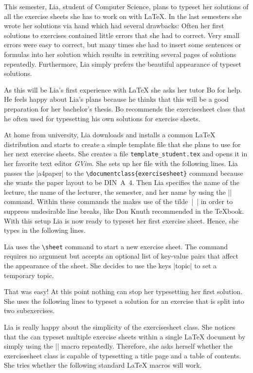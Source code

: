 \documentclass[a4paper,fleqn]{report}
\def\exercisesheet{{exercisesheet}}
\begin{document}
This semester, Lia, student of Computer Science, plans to typeset her
solutions of all the exercise sheets she has to work on with \LaTeX.
In the last semesters she wrote her solutions via hand which had
several drawbacks: Often her first solutions to exercises contained
little errors that she had to correct. Very small errors were easy to
correct, but many times she had to insert some sentences or formulas
into her solution which results in rewriting several pages of
solutions repeatedly. Furthermore, Lia simply prefers the beautiful
appearance of typeset solutions.

As this will be Lia's first experience with \LaTeX{} she asks her
tutor Bo for help. He feels happy about Lia's plans because he thinks
that this will be a good preparation for her bachelor's thesis. Bo
recommends the \exercisesheet{} class that he often used for
typesetting his own solutions for exercise sheets.

At home from university, Lia downloads and installs a common \LaTeX{}
distribution and starts to create a simple template file that she
plans to use for her next exercise sheets. She creates a file
\lstinline[language={}]|template_student.tex| and opens it in her
favorite text editor \emph{GVim}. She sets up her file with the
following lines.
 Lia passes the
|a4paper| to the \lstinline|\documentclass{exercisesheet}| command
because she wants the paper layout to be DIN~A~4. Then Lia specifies
the name of the lecture, the name of the lecturer, the semester, and
her name by using the |\sheetconf| command. Within these commands the
makes use of the tilde~|~| in order to suppress undesirable line
breaks, like Don Knuth recommended in the \TeX{}book. With this setup
Lia is now ready to typeset her first exercise sheet. Hence, she types
in the following lines.

Lia uses the \lstinline|\sheet| command to start a new exercise sheet.
The command requires no argument but accepts an optional list of
key-value pairs that affect the appearance of the sheet. She decides
to use the keys |topic| to set a temporary topic.

That was easy! At this point nothing can stop her typesetting her
first solution. She uses the following lines to typeset a solution for
an exercise that is split into two subexercises.



\noindent Lia is really happy about the simplicity of the
\exercisesheet{} class. She notices that the can typeset multiple
exercise sheets within a single \LaTeX{} document by simply using the
|\sheet| macro repeatedly. Therefore, she asks herself whether the
\exercisesheet{} class is capable of typesetting a title page and a
table of contents. She tries whether the following standard \LaTeX{}
macros will work.
\end{document}
